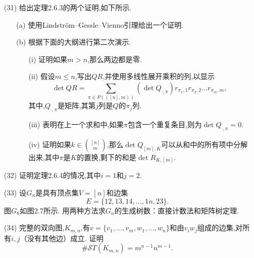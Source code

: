 \documentclass{ctexbook}
\begin{document}
\begin{enumerate}
	\item[(31)]给出定理2.6.3的两个证明,如下所示. 
	\begin{enumerate}
		\item[(a)] 使用Lindström–Gessle–Vienno引理给出一个证明. 
		\item[(b)]根据下面的大纲进行第二次演示. 
		\begin{enumerate}
			\item[(i)]证明如果$m>n$,那么两边都是零. 
			\item[(ii)]假设$m\le n$,写出$QR$,并使用多线性展开乘积的列,以显示
			$$\operatorname{det}QR=\sum_{\pi\in P(([n],m))}(\operatorname{det}Q_{\cdot,\pi})r_{\pi_1,1}r_{\pi_2,2}\dots r_{\pi_m,m},$$其中,$Q_{\cdot,\pi}$是矩阵,其第$j$列是$Q$的$\pi_{j}$列.
			\item[(iii)]表明在上一个求和中,如果$\pi$包含一个重复条目,则为$\operatorname{det}Q_{\cdot,\pi}=0$. 
			\item[(iv)]证明如果$k\in\binom{[n]}{m}$,那么$\operatorname{det}Q_{[m],K}$可以从和中的所有项中分解出来,其中$\pi$是$K$的置换,剩下的和是$\operatorname{det}R_{K,[m]}$. 
		\end{enumerate}	
	\end{enumerate}
\end{enumerate}



\begin{enumerate}
	\item[(32)]证明定理2.6.4的情况,其中$i=1$和$j=2$.
\end{enumerate}

\begin{enumerate}
	\item[(33)]设$G_n$是具有顶点集$V=[n]$和边集
	$$
	E=\{12,13,14,\dots,1n,23\}.
	$$
	图$G_6$如图2.7所示. 用两种方法求$G_n$的生成树数：直接计数法和矩阵树定理. 
\end{enumerate}

\begin{enumerate}
	\item[(34)]完整的双向图,$K_{m,n}$,有$v=\{v_1,\dots,v_m,w_1,\dots,w_n\}$和由$v_iw_j$组成的边集,对所有$i,j$（没有其他边）成立. 证明
	$$\#\mathcal{S}T(K_{m,n})=m^{n-1}n^{m-1}.$$
\end{enumerate}
\end{document}
